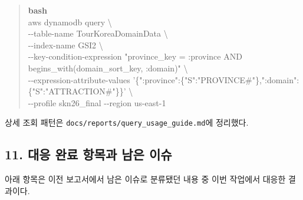 \documentclass[12pt,a4paper]{article}
\newcommand{\DocNeedspace}[1]{\par\ifdim\dimexpr\pagegoal-\pagetotal\relax<#1\newpage\fi}
\begin{document}
\DocNeedspace{7\baselineskip}
\begin{quote}
\begin{scriptsize}
\ttfamily
\RaggedRight
\setlength{\parskip}{1pt}
\textcolor{LovvGreen}{\textbf{bash}}\\[0.2em]
aws dynamodb query \textbackslash{}\\
\hspace*{1.10em}-\allowbreak{}-\allowbreak{}table-\allowbreak{}name Tour\allowbreak{}Korea\allowbreak{}Domain\allowbreak{}Data \textbackslash{}\\
\hspace*{1.10em}-\allowbreak{}-\allowbreak{}index-\allowbreak{}name GSI2 \textbackslash{}\\
\hspace*{1.10em}-\allowbreak{}-\allowbreak{}key-\allowbreak{}condition-\allowbreak{}expression "province\_\allowbreak{}key = :\allowbreak{}province AND begins\_\allowbreak{}with(domain\_\allowbreak{}sort\_\allowbreak{}key, :\allowbreak{}domain)" \textbackslash{}\\
\hspace*{1.10em}-\allowbreak{}-\allowbreak{}expression-\allowbreak{}attribute-\allowbreak{}values '\{\allowbreak{}":\allowbreak{}province":\allowbreak{}\{\allowbreak{}"S":\allowbreak{}"PROVINCE\#"\allowbreak{}\},":\allowbreak{}domain":\allowbreak{}\{\allowbreak{}"S":\allowbreak{}"ATTRACTION\#\allowbreak{}"\allowbreak{}\}\allowbreak{}\}' \textbackslash{}\\
\hspace*{1.10em}-\allowbreak{}-\allowbreak{}profile skn26\_\allowbreak{}final -\allowbreak{}-\allowbreak{}region us-\allowbreak{}east-\allowbreak{}1\\
\end{scriptsize}
\end{quote}


\DocNeedspace{3\baselineskip}
상세 조회 패턴은 \texttt{docs/\allowbreak{}reports/\allowbreak{}query\_\allowbreak{}usage\_\allowbreak{}guide.\allowbreak{}md}에 정리했다.


\DocNeedspace{24\baselineskip}
\subsection*{11. 대응 완료 항목과 남은 이슈}


\DocNeedspace{3\baselineskip}
아래 항목은 이전 보고서에서 남은 이슈로 분류됐던 내용 중 이번 작업에서 대응한 결과이다.
\end{document}
